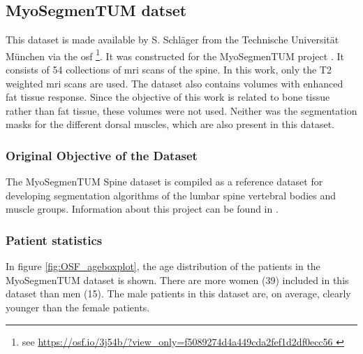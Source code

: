 \subsection{MyoSegmenTUM datset}

This dataset is made available by S. Schläger from the Technische Universität München via the \acrfull{osf} \footnote{see \url{ https://osf.io/3j54b/?view_only=f5089274d4a449cda2fef1d2df0ecc56 }}.
It was constructed for the MyoSegmenTUM project \cite{Burian2019}.
It consists of 54 collections of \acrshort{mri} scans of the spine.
In this work, only the T2 weighted \acrlong{mri} scans are used.
The dataset also contains volumes with enhanced fat tissue response. Since the objective of this work is related to bone tissue rather than fat tissue, these volumes were not used.
Neither was the segmentation masks for the different dorsal muscles, which are also present in this dataset.

\subsubsection{Original Objective of the Dataset}

The MyoSegmenTUM Spine dataset is compiled as a reference dataset for developing segmentation algorithms of the lumbar spine vertebral bodies and muscle groups.
Information about this project can be found in \cite{Burian2019}.

\subsubsection{Patient statistics}

In figure \ref{fig:OSF_ageboxplot}, the age distribution of the patients in the MyoSegmenTUM dataset is shown.
There are more women (39) included in this dataset than men (15).
The male patients in this dataset are, on average, clearly younger than the female patients.



